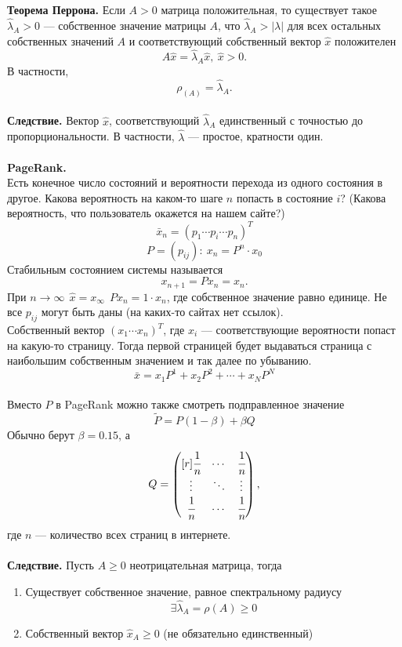 \documentclass[12pt]{article}
\theoremstyle{definition}
\numberwithin{equation}{section}
\begin{document}
\\
\\
\textbf{Теорема Перрона.} Если $A>0$ матрица положительная, то существует такое $\hat \lambda_A>0$ --- собственное значение матрицы $A$, что $\hat \lambda_A>|\lambda|$ для всех остальных собственных значений $A$ и соответствующий собственный вектор $\hat x$ положителен
$$A\hat x=\hat \lambda_A \hat x,~\hat x>0.$$
В частности, $$\rho_(A)=\hat \lambda_A.$$
\\
\textbf{Следствие.} Вектор $\hat x$, соответствующий $\hat \lambda_A$ единственный с точностью до пропорциональности. В частности, $\hat \lambda$ --- простое, кратности один.\\
\\
\textbf{PageRank.}\\
Есть конечное число состояний и вероятности перехода из одного состояния в другое. Какова вероятность на каком-то шаге $n$ попасть в состояние $i$? (Какова вероятность, что пользователь окажется на нашем сайте?)
$$\bar x_n=(p_1 \cdots p_i \cdots p_n)^T$$
$$P=(p_{ij}):~x_n=P^n\cdot x_0$$
Стабильным состоянием системы называется $$x_{n+1}=Px_n=x_n.$$
При $n\to \infty ~~\hat x=x_{\infty}~~Px_n=1\cdot x_n$, где собственное значение равно единице.
Не все $p_{ij}$ могут быть даны (на каких-то сайтах нет ссылок).\\
Собственный вектор $(x_1 \cdots x_n)^T$, где $x_i$ --- соответствующие вероятности попаст на какую-то страницу. Тогда первой страницей будет выдаваться страница с наибольшим собственным значением и так далее по убыванию.
$$\bar x=x_1P^1+x_2P^2+\cdots +x_NP^N$$
\\
Вместо $P$ в PageRank можно также смотреть подправленное значение $$\tilde{ P}=P(1-\beta)+\beta Q$$ Обычно берут $\beta=0.15$, а 
\[Q = \begin{pmatrix}[r]
\cfrac{1}{n} & \cdots & \cfrac{1}{n}\\
\vdots & \ddots & \vdots\\
\cfrac{1}{n} & \cdots & \cfrac{1}{n}\\
\end{pmatrix},\]
где $n$ --- количество всех страниц в интернете.\\ \\
\textbf{Следствие.} Пусть $A\geqslant 0$ неотрицательная матрица, тогда
\begin{enumerate}
    \item Существует собственное значение, равное спектральному радиусу $$\exists \hat \lambda_A=\rho(A)\geqslant 0$$
    \item Собственный вектор $\hat x_A\geqslant 0$ (не обязательно единственный)
\end{enumerate}
\end{document}
